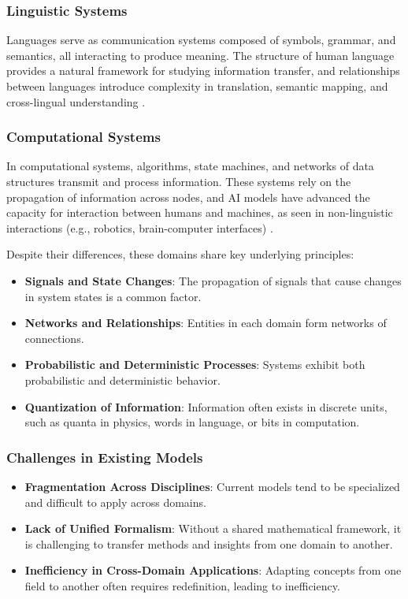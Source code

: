 \subsubsection{Linguistic Systems}

Languages serve as communication systems composed of symbols, grammar, and semantics, all interacting to produce meaning. The structure of human language provides a natural framework for studying information transfer, and relationships between languages introduce complexity in translation, semantic mapping, and cross-lingual understanding \cite{linguistics_reference}.

\subsubsection{Computational Systems}

In computational systems, algorithms, state machines, and networks of data structures transmit and process information. These systems rely on the propagation of information across nodes, and AI models have advanced the capacity for interaction between humans and machines, as seen in non-linguistic interactions (e.g., robotics, brain-computer interfaces) \cite{computational_systems_reference}.

Despite their differences, these domains share key underlying principles:

\begin{itemize}
    \item \textbf{Signals and State Changes}: The propagation of signals that cause changes in system states is a common factor.
    \item \textbf{Networks and Relationships}: Entities in each domain form networks of connections.
    \item \textbf{Probabilistic and Deterministic Processes}: Systems exhibit both probabilistic and deterministic behavior.
    \item \textbf{Quantization of Information}: Information often exists in discrete units, such as quanta in physics, words in language, or bits in computation.
\end{itemize}

\subsubsection{Challenges in Existing Models}

\begin{itemize}
    \item \textbf{Fragmentation Across Disciplines}: Current models tend to be specialized and difficult to apply across domains.
    \item \textbf{Lack of Unified Formalism}: Without a shared mathematical framework, it is challenging to transfer methods and insights from one domain to another.
    \item \textbf{Inefficiency in Cross-Domain Applications}: Adapting concepts from one field to another often requires redefinition, leading to inefficiency.
\end{itemize}

